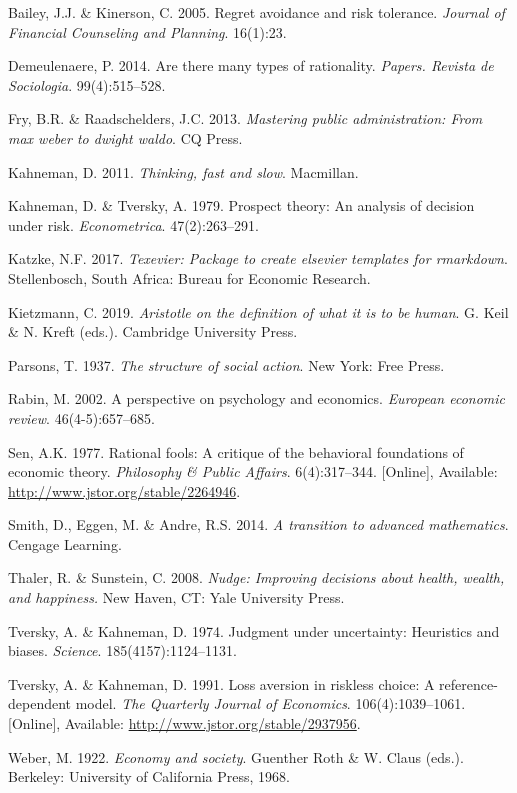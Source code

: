 \documentclass[11pt,preprint, authoryear]{elsarticle}
\numberwithin{equation}{section}
\numberwithin{figure}{section}
\numberwithin{table}{section}
\newlength{\cslhangindent}
\newenvironment{CSLReferences}%
  {\setlength{\parindent}{0pt}%
  \everypar{\setlength{\hangindent}{\cslhangindent}}\ignorespaces}%
  {\par}
\begin{document}
\hypertarget{refs}{}
\begin{CSLReferences}{1}{0}
\leavevmode\hypertarget{ref-regret}{}%
Bailey, J.J. \& Kinerson, C. 2005. Regret avoidance and risk tolerance.
\emph{Journal of Financial Counseling and Planning}. 16(1):23.

\leavevmode\hypertarget{ref-types}{}%
Demeulenaere, P. 2014. Are there many types of rationality.
\emph{Papers. Revista de Sociologia}. 99(4):515--528.

\leavevmode\hypertarget{ref-fry}{}%
Fry, B.R. \& Raadschelders, J.C. 2013. \emph{Mastering public
administration: From max weber to dwight waldo}. CQ Press.

\leavevmode\hypertarget{ref-fast}{}%
Kahneman, D. 2011. \emph{Thinking, fast and slow}. Macmillan.

\leavevmode\hypertarget{ref-prospect}{}%
Kahneman, D. \& Tversky, A. 1979. Prospect theory: An analysis of
decision under risk. \emph{Econometrica}. 47(2):263--291.

\leavevmode\hypertarget{ref-Texevier}{}%
Katzke, N.F. 2017. \emph{{Texevier}: {P}ackage to create elsevier
templates for rmarkdown}. Stellenbosch, South Africa: Bureau for
Economic Research.

\leavevmode\hypertarget{ref-aristotle}{}%
Kietzmann, C. 2019. \emph{Aristotle on the definition of what it is to
be human}. G. Keil \& N. Kreft (eds.). Cambridge University Press.

\leavevmode\hypertarget{ref-parsons}{}%
Parsons, T. 1937. \emph{The structure of social action}. New York: Free
Press.

\leavevmode\hypertarget{ref-rabin}{}%
Rabin, M. 2002. A perspective on psychology and economics.
\emph{European economic review}. 46(4-5):657--685.

\leavevmode\hypertarget{ref-sen}{}%
Sen, A.K. 1977. Rational fools: A critique of the behavioral foundations
of economic theory. \emph{Philosophy \& Public Affairs}. 6(4):317--344.
{[}Online{]}, Available: \url{http://www.jstor.org/stable/2264946}.

\leavevmode\hypertarget{ref-math}{}%
Smith, D., Eggen, M. \& Andre, R.S. 2014. \emph{A transition to advanced
mathematics}. Cengage Learning.

\leavevmode\hypertarget{ref-nudge}{}%
Thaler, R. \& Sunstein, C. 2008. \emph{Nudge: Improving decisions about
health, wealth, and happiness.} New Haven, CT: Yale University Press.

\leavevmode\hypertarget{ref-khan}{}%
Tversky, A. \& Kahneman, D. 1974. Judgment under uncertainty: Heuristics
and biases. \emph{Science}. 185(4157):1124--1131.

\leavevmode\hypertarget{ref-ref}{}%
Tversky, A. \& Kahneman, D. 1991. Loss aversion in riskless choice: A
reference-dependent model. \emph{The Quarterly Journal of Economics}.
106(4):1039--1061. {[}Online{]}, Available:
\url{http://www.jstor.org/stable/2937956}.

\leavevmode\hypertarget{ref-weber}{}%
Weber, M. 1922. \emph{Economy and society}. Guenther Roth \& W. Claus
(eds.). Berkeley: University of California Press, 1968.

\end{CSLReferences}


\end{document}
